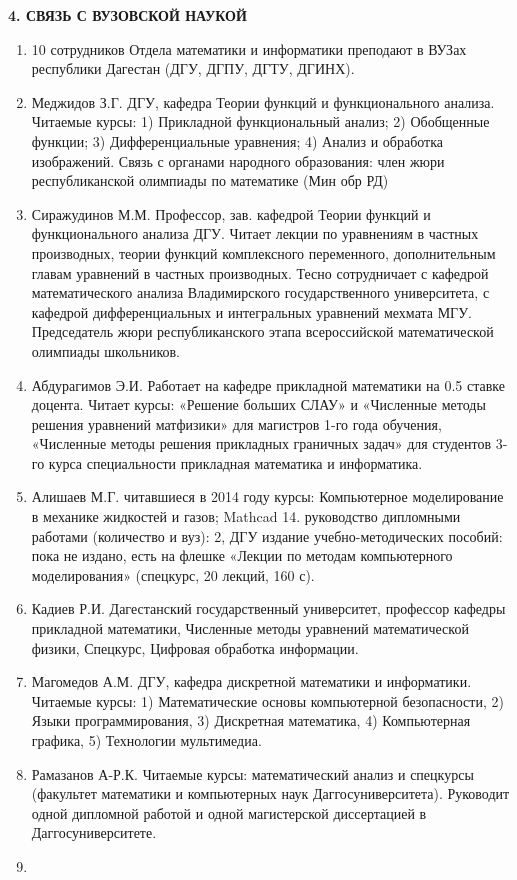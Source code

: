 \documentclass{article}
\begin{document}
\noindent \eject

\noindent \textbf{4. СВЯЗЬ С ВУЗОВСКОЙ НАУКОЙ}

\begin{enumerate}
\item  10 сотрудников Отдела математики и информатики преподают в ВУЗах республики Дагестан (ДГУ, ДГПУ, ДГТУ, ДГИНХ).

\item  Меджидов З.Г. ДГУ, кафедра Теории функций и функционального анализа. Читаемые курсы: 1) Прикладной функциональный анализ; 2) Обобщенные функции; 3) Дифференциальные уравнения; 4) Анализ и обработка изображений. Связь с органами народного образования: член жюри республиканской олимпиады по математике (Мин обр РД)

\item  Сиражудинов М.М. Профессор, зав. кафедрой Теории функций и функционального анализа ДГУ. Читает лекции по уравнениям в частных производных, теории функций комплексного переменного, дополнительным главам уравнений в частных производных. Тесно сотрудничает с кафедрой математического анализа Владимирского государственного университета, с кафедрой дифференциальных и интегральных уравнений мехмата МГУ. Председатель жюри республиканского этапа всероссийской математической олимпиады школьников.

\item  Абдурагимов Э.И. Работает на кафедре прикладной математики на 0.5 ставке доцента. Читает курсы: «Решение больших СЛАУ»  и «Численные методы решения уравнений матфизики» для магистров 1-го года обучения, «Численные методы решения прикладных граничных задач» для студентов 3-го курса специальности прикладная математика и информатика.

\item  Алишаев М.Г. читавшиеся в 2014 году курсы: Компьютерное моделирование в механике жидкостей и газов; Mathcad 14. руководство дипломными работами (количество и вуз): 2, ДГУ издание учебно-методических пособий: пока не издано, есть на  флешке «Лекции по методам компьютерного моделирования» (спецкурс, 20 лекций, 160 с).

\item  Кадиев Р.И. Дагестанский государственный университет, профессор кафедры прикладной математики, Численные методы уравнений математической физики, Спецкурс, Цифровая обработка информации.

\item  Магомедов А.М. ДГУ, кафедра дискретной математики и информатики. Читаемые курсы: 1) Математические основы компьютерной безопасности, 2) Языки программирования, 3) Дискретная математика, 4) Компьютерная графика, 5) Технологии мультимедиа.

\item  Рамазанов А-Р.К. Читаемые курсы: математический анализ и спецкурсы (факультет математики и компьютерных наук  Даггосуниверситета). Руководит одной дипломной работой и одной магистерской диссертацией в Даггосуниверситете.

\item
\end{enumerate}
\end{document}
